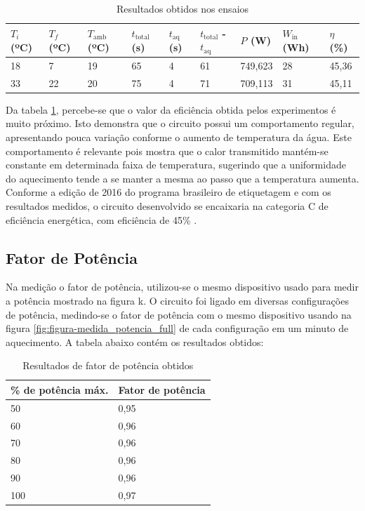 \begin{table}[H]
    \centering
    \caption{Resultados obtidos nos ensaios}
    \begin{tabular}{|l|l|l|l|l|l|l|l|l|} 
	\hline
	$T_i$ (ºC) &$T_f$ (ºC)	&$T_\mathrm{amb}$ (ºC)	 &$t_\mathrm{total}$ (s)	&$t_\mathrm{aq}$ (s)	 &$t_\mathrm{total}$  -  $t_\mathrm{aq}$	&$P$ (W)	&$W_\mathrm{in}$ (Wh)	&$\eta$ (\%)\\\hline	
	18	&7	&19	&65	&4	&61	&749,623	&28	&45,36\\\hline	
	33	&22	&20	&75	&4	&71	&709,113	&31	&45,11\\\hline
    \end{tabular}
    \label{table-eff}
\end{table}


Da tabela \ref{table-eff}, percebe-se que o valor da eficiência obtida pelos experimentos é muito próximo. Isto demonstra que o circuito possui um comportamento regular, apresentando pouca variação conforme o aumento de temperatura da água. Este comportamento é relevante pois mostra que o calor transmitido mantém-se constante em determinada faixa de temperatura, sugerindo que a uniformidade do aquecimento tende a se manter a mesma ao passo que a temperatura aumenta. Conforme a edição de 2016 do programa brasileiro de etiquetagem e com os resultados medidos, o circuito desenvolvido se encaixaria na categoria C de eficiência energética, com eficiência de 45\% \cite{Etiquetagem}.

\subsection{Fator de Potência}

Na medição o fator de potência,  utilizou-se o mesmo dispositivo usado para medir a potência mostrado na figura k. O circuito foi ligado em diversas configurações de potência, medindo-se o fator de potência com o mesmo dispositivo usando na figura \ref{fig:figura-medida_potencia_full} de cada configuração em um minuto de aquecimento. A tabela abaixo contém os resultados obtidos:

\begin{table}[H]
    \centering
    \caption{Resultados de fator de potência obtidos}
	\begin{tabular}{|l|l|} 
		\hline
		\% de potência máx. &Fator de potência\\\hline
		50 &0,95\\\hline
		60 &0,96\\\hline
		70 &0,96\\\hline
		80 &0,96\\\hline
		90 &0,96\\\hline
		100 &0,97\\\hline
	\end{tabular}
    \label{table-fp}
\end{table}

